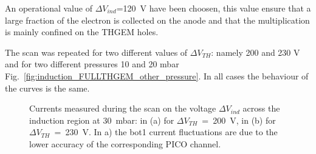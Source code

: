 \documentclass[a4paper, 11 pt]{report}
\newcommand{\Vind}{$\Delta V_{ind}$}
\newcommand{\Vthgem}{$\Delta V_{TH}$}
\begin{document}
An operational value of \Vind{}=120~V have been choosen, this value ensure that a large fraction of 
the electron is collected on the anode and that the multiplication is mainly confined on the THGEM 
holes.

The scan was repeated for two different values of \Vthgem{}: namely 200 and 230 V 
and for two different pressures 10 and 20 mbar 
Fig.~\ref{fig:induction_FULLTHGEM_other_pressure}. In all cases the behaviour of the
curves is the same.

\begin{figure}[!htb]
	\centering
	\caption{Currents measured during the scan on the voltage \Vind{} across the induction region at 
	  30~mbar: in (a) for \Vthgem~=~200~V, in (b) for \Vthgem~=~230~V. In a) the bot1 current 
	  fluctuations are due to the lower accuracy of the corresponding PICO channel.}
	\label{fig:induction_FULLTHGEM_30mbar_other_VTHGEM}
\end{figure}
\end{document}
